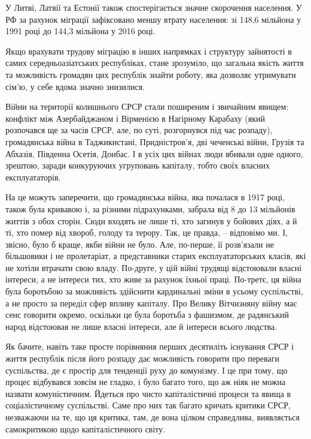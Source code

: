 \documentclass[12pt,a4paper,openany]{book}
\begin{document}
У Литві, Латвії та Естонії також спостерігається значне скорочення населення. У РФ за рахунок міграції зафіксовано меншу втрату населення: зі 148,6 мільйона у 1991 році до 144,3 мільйона у 2016 році.

Якщо врахувати трудову міграцію в інших напрямках і структуру зайнятості в самих середньоазіатських республіках, стане зрозуміло, що загальна якість життя та можливість громадян цих республік знайти роботу, яка дозволяє утримувати сім’ю, у себе вдома значно знизилися.

Війни на території колишнього СРСР стали поширеним і звичайним явищем: конфлікт між Азербайджаном і Вірменією в Нагірному Карабаху (який розпочався ще за часів СРСР, але, по суті, розгорнувся під час розпаду), громадянська війна в Таджикистані, Придністров’я, дві чеченські війни, Грузія та Абхазія, Південна Осетія, Донбас. І в усіх цих війнах люди вбивали одне одного, зрештою, заради конкуруючих угруповань капіталу, тобто своїх власних експлуататорів.

На це можуть заперечити, що громадянська війна, яка почалася в 1917 році, також була кривавою і, за різними підрахунками, забрала від 8 до 13 мільйонів життів з обох сторін. Сюди входять не лише ті, хто загинув у бойових діях, а й ті, хто помер від хвороб, голоду та терору. Так, це правда, – відповімо ми. І, звісно, було б краще, якби війни не було. Але, по-перше, її розв’язали не більшовики і не пролетаріат, а представники старих експлуататорських класів, які не хотіли втрачати свою владу. По-друге, у цій війні трудящі відстоювали власні інтереси, а не інтереси тих, хто живе за рахунок їхньої праці. По-третє, ця війна була боротьбою за можливість здійснити кардинальні зміни в усьому суспільстві, а не просто за переділ сфер впливу капіталу. Про Велику Вітчизняну війну має сенс говорити окремо, оскільки це була боротьба з фашизмом, де радянський народ відстоював не лише власні інтереси, але й інтереси всього людства.

Як бачите, навіть таке просте порівняння перших десятиліть існування СРСР і життя республік після його розпаду дає можливість говорити про переваги суспільства, де є простір для тенденції руху до комунізму. І це при тому, що процес відбувався зовсім не гладко, і було багато того, що аж ніяк не можна назвати комуністичним. Йдеться про чисто капіталістичні процеси та явища в соціалістичному суспільстві. Саме про них так багато кричать критики СРСР, незважаючи на те, що ця критика, там, де вона цілком справедлива, виявляється самокритикою щодо капіталістичного світу.
\end{document}
